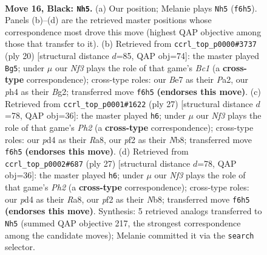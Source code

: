 \documentclass[11pt]{article}
\begin{document}
\clearpage

\begin{figure}[p]\centering
\begin{subfigure}{0.46\textwidth}\centering
\resizebox{\linewidth}{!}{%
\newchessgame
\chessboard[
  setfen={rnb1kr2/p3b1pp/1p1q1n2/3p1p2/1p1P3P/P3PNPB/R3QP2/1NB1R1K1 b - - 1 16},
  showmover=false,
  pgfstyle=straightmove, color=movearrow, markmove={f6-h5}
]}
\caption{}
\end{subfigure}\hfill
\begin{subfigure}{0.46\textwidth}\centering
\resizebox{\linewidth}{!}{%
\newchessgame
\chessboard[
  setfen={r2q1rk1/pb3p1p/1pn1pnp1/2bp4/2P5/5NP1/PPQ1PPBP/RNB2RK1 w - - 0 11},
  showmover=false,
  pgfstyle=straightmove, color=movearrow, markmove={c1-g5}
]}
\caption{}
\end{subfigure}
\\[4pt]
\begin{subfigure}{0.46\textwidth}\centering
\resizebox{\linewidth}{!}{%
\newchessgame
\chessboard[
  setfen={rn1r2k1/p3bppp/1qbppn2/2p5/2P2B2/1QN1P2P/PP1NBPP1/R2R2K1 b - - 1 14},
  showmover=false,
  pgfstyle=straightmove, color=movearrow, markmove={h7-h6}
]}
\caption{}
\end{subfigure}\hfill
\begin{subfigure}{0.46\textwidth}\centering
\resizebox{\linewidth}{!}{%
\newchessgame
\chessboard[
  setfen={rn1r2k1/p3bppp/1qbppn2/2p5/2P2B2/1QN1P2P/PP1NBPP1/R2R2K1 b - - 3 14},
  showmover=false,
  pgfstyle=straightmove, color=movearrow, markmove={h7-h6}
]}
\caption{}
\end{subfigure}
\caption{\textbf{Move 16, Black: \texttt{Nh5}.} (a) Our position; Melanie plays \texttt{Nh5} (\texttt{f6h5}). Panels (b)--(d) are the retrieved master positions whose correspondence most drove this move (highest QAP objective among those that transfer to it). (b) Retrieved from \texttt{ccrl\_top\_p0000\#3737} (ply 20) [structural distance $d$=85, QAP obj=74]: the master played \texttt{Bg5}; under $\mu$ our \emph{Nf3} plays the role of that game's \emph{Bc1} (a \textbf{cross-type} correspondence); cross-type roles: our \emph{B}e7 as their \emph{P}a2, our \emph{p}h4 as their \emph{B}g2; transferred move \texttt{f6h5} \textbf{(endorses this move)}. (c) Retrieved from \texttt{ccrl\_top\_p0001\#1622} (ply 27) [structural distance $d$=78, QAP obj=36]: the master played \texttt{h6}; under $\mu$ our \emph{Nf3} plays the role of that game's \emph{Ph2} (a \textbf{cross-type} correspondence); cross-type roles: our \emph{p}d4 as their \emph{R}a8, our \emph{p}f2 as their \emph{N}b8; transferred move \texttt{f6h5} \textbf{(endorses this move)}. (d) Retrieved from \texttt{ccrl\_top\_p0002\#687} (ply 27) [structural distance $d$=78, QAP obj=36]: the master played \texttt{h6}; under $\mu$ our \emph{Nf3} plays the role of that game's \emph{Ph2} (a \textbf{cross-type} correspondence); cross-type roles: our \emph{p}d4 as their \emph{R}a8, our \emph{p}f2 as their \emph{N}b8; transferred move \texttt{f6h5} \textbf{(endorses this move)}. Synthesis: 5 retrieved analogs transferred to \texttt{Nh5} (summed QAP objective 217, the strongest correspondence among the candidate moves); Melanie committed it via the \texttt{search} selector.}

\end{figure}
\end{document}
